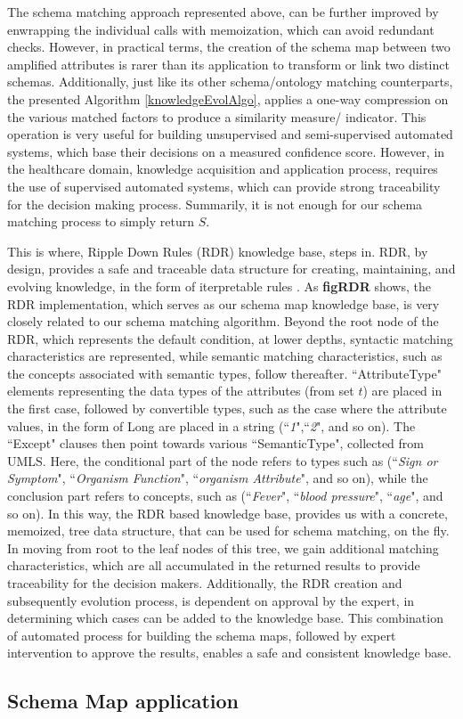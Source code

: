 The schema matching approach represented above, can be further improved by enwrapping the individual calls with memoization, which can avoid redundant checks. However, in practical terms, the creation of the schema map between two amplified attributes is rarer than its application to transform or link two distinct schemas. Additionally, just like its other schema/ontology matching counterparts, the presented Algorithm \ref{knowledgeEvolAlgo}, applies a one-way compression on the various matched factors to produce a similarity measure/ indicator. This operation is very useful for building unsupervised and semi-supervised automated systems, which base their decisions on a measured confidence score. However, in the healthcare domain, knowledge acquisition and application process, requires the use of supervised automated systems, which can provide strong traceability for the decision making process. Summarily, it is not enough for our schema matching process to simply return $S$.

This is where, Ripple Down Rules (RDR) knowledge base, steps in. RDR, by design, provides a safe and traceable data structure for creating, maintaining, and evolving knowledge, in the form of iterpretable rules \cite{compton1992ripple, richards2009two, kim2018rdr}. As \textbf{figRDR} shows, the RDR implementation, which serves as our schema map knowledge base, is very closely related to our schema matching algorithm. Beyond the root node of the RDR, which represents the default condition, at lower depths, syntactic matching characteristics are represented, while semantic matching characteristics, such as the concepts associated with semantic types, follow thereafter. ``AttributeType" elements representing the data types of the attributes (from set $t$) are placed in the first case, followed by convertible types, such as the case where the attribute values, in the form of Long are placed in a string (``\textit{1}",``\textit{2}", and so on). The ``Except" clauses then point towards various ``SemanticType", collected from UMLS. Here, the conditional part of the node refers to types such as (``\textit{Sign or Symptom}", ``\textit{Organism Function}", ``\textit{organism Attribute}", and so on), while the conclusion part refers to concepts, such as (``\textit{Fever}", ``\textit{blood pressure}", ``\textit{age}", and so on). In this way, the RDR based knowledge base, provides us with a concrete, memoized, tree data structure, that can be used for schema matching, on the fly. In moving from root to the leaf nodes of this tree, we gain additional matching characteristics, which are all accumulated in the returned results to provide traceability for the decision makers. Additionally, the RDR creation and subsequently evolution process, is dependent on approval by the expert, in determining which cases can be added to the knowledge base. This combination of automated process for building the schema maps, followed by expert intervention to approve the results, enables a safe and consistent knowledge base. 

\subsection*{Schema Map application}
\label{schema_map_evol}

